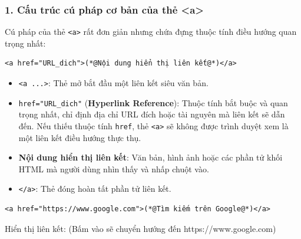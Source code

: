 \documentclass[11pt,oneside]{book}
\newcommand{\codeinline}[1]{\textcolor{accentOrange}{\texttt{#1}}}
\begin{document}
\subsubsection{1. Cấu trúc cú pháp cơ bản của thẻ <a>}

Cú pháp của thẻ \codeinline{<a>} rất đơn giản nhưng chứa đựng thuộc tính điều hướng quan trọng nhất:

\begin{codeWindow}
\begin{lstlisting}[language=HTML5]
<a href="URL_dich">(*@Nội dung hiển thị liên kết@*)</a>
\end{lstlisting}
\end{codeWindow}

\begin{conceptBox}
\begin{itemize}[leftmargin=1.5em, itemsep=3pt, parsep=0pt]
    \item \codeinline{<a ...>}: Thẻ mở bắt đầu một liên kết siêu văn bản.
    \item \codeinline{href="URL\_dich"} (\textbf{Hyperlink Reference}): Thuộc tính bắt buộc và quan trọng nhất, chỉ định địa chỉ URL đích hoặc tài nguyên mà liên kết sẽ dẫn đến. Nếu thiếu thuộc tính \codeinline{href}, thẻ \codeinline{<a>} sẽ không được trình duyệt xem là một liên kết điều hướng thực thụ.
    \item \textbf{Nội dung hiển thị liên kết}: Văn bản, hình ảnh hoặc các phần tử khối HTML mà người dùng nhìn thấy và nhấp chuột vào.
    \item \codeinline{</a>}: Thẻ đóng hoàn tất phần tử liên kết.
\end{itemize}
\end{conceptBox}

\begin{codeWindow}
\begin{lstlisting}[language=HTML5]
<a href="https://www.google.com">(*@Tìm kiếm trên Google@*)</a>
\end{lstlisting}
\end{codeWindow}

\begin{tcolorbox}[
    enhanced, colback=white, colframe=primaryBlue!20, arc=6pt, boxrule=0.8pt, drop shadow=black!3!white,
    top=8pt, bottom=8pt, left=12pt, right=12pt,
    title={\sffamily\bfseries\scriptsize\color{codeComment} KẾT QUẢ HIỂN THỊ TRÊN TRÌNH DUYỆT (BROWSER PREVIEW)},
    coltitle=codeComment, colbacktitle=codeBg!80!white
]
Hiển thị liên kết: \underline{} \hfill \scriptsize\color{codeComment}(Bấm vào sẽ chuyển hướng đến https://www.google.com)
\end{tcolorbox}
\end{document}
